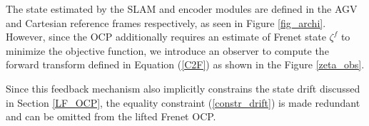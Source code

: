 \par The state estimated by the \ac{SLAM} and encoder modules are defined in the \ac{AGV} and Cartesian reference frames respectively, as seen in Figure \ref{fig_archi}. However, since the \ac{OCP} additionally requires an estimate of Frenet state $\zeta^{f}$ to minimize the objective function, we introduce an observer to compute the forward transform defined in Equation (\ref{C2F}) as shown in the Figure \ref{zeta_obs}.
\par Since this feedback mechanism also implicitly constrains the state drift discussed in Section \ref{LF_OCP}, the equality constraint (\ref{constr_drift}) is made redundant and can be omitted from the lifted Frenet \ac{OCP}.